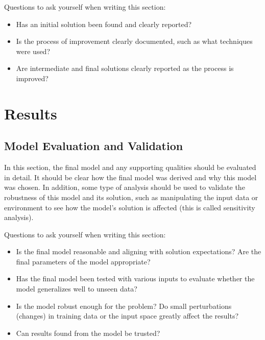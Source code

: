 \documentclass[twoside,openright,titlepage,numbers=noenddot,headinclude,%
               footinclude=true,cleardoublepage=empty,abstractoff,BCOR=5mm,%
               paper=a4,fontsize=11pt,ngerman,american]{scrreprt}
\numberwithin{theorem}{chapter}
\numberwithin{definition}{chapter}
\numberwithin{algorithm}{chapter}
\numberwithin{figure}{chapter}
\numberwithin{table}{chapter}
\numberwithin{equation}{chapter}
\begin{document}
Questions to ask yourself when writing this section:
\begin{itemize}%
\item Has an initial solution been found and clearly reported?
\item Is the process of improvement clearly documented, such as what techniques were used?
\item Are intermediate and final solutions clearly reported as the process is improved?
\end{itemize}

\chapter*{Results}


\section*{Model Evaluation and Validation}
In this section, the final model and any supporting qualities should be evaluated in detail. It should be clear how the final model was derived and why this model was chosen. In addition, some type of analysis should be used to validate the robustness of this model and its solution, such as manipulating the input data or environment to see how the model’s solution is affected (this is called sensitivity analysis). 


Questions to ask yourself when writing this section:
\begin{itemize}%
\item Is the final model reasonable and aligning with solution expectations? Are the final parameters of the model appropriate?
\item Has the final model been tested with various inputs to evaluate whether the model generalizes well to unseen data?
\item Is the model robust enough for the problem? Do small perturbations (changes) in training data or the input space greatly affect the results?
\item Can results found from the model be trusted?
\end{itemize}
\end{document}
